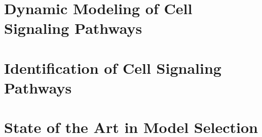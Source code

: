 \section{Dynamic Modeling of Cell Signaling Pathways}
\section{Identification of Cell Signaling Pathways}
\section{State of the Art in Model Selection}
